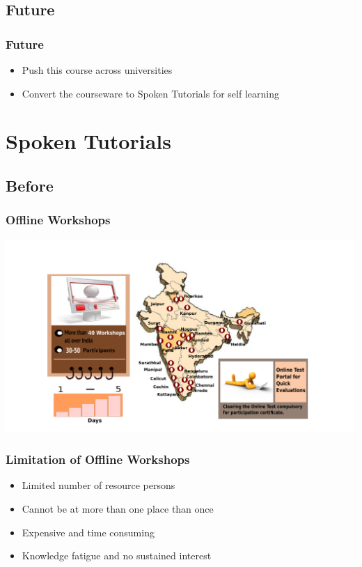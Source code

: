 \documentclass[compress,red]{beamer} %
\begin{document}
\subsection{Future}
\begin{frame}
\frametitle{Future}
\begin{itemize}
\item Push this course across universities
\item Convert the courseware to Spoken Tutorials for self learning
\end{itemize}
\end{frame}

\section{Spoken Tutorials}
\subsection{Before}
\begin{frame}
\frametitle{Offline Workshops}
\includegraphics[scale=.15]{workshop.png}
\end{frame}

\begin{frame}
\frametitle{Limitation of Offline Workshops}
\begin{itemize}
\item Limited number of resource persons
\item Cannot be at more than one place than once
\item Expensive and time consuming
\item Knowledge fatigue and no sustained interest
\end{itemize}
\end{frame}
\end{document}
